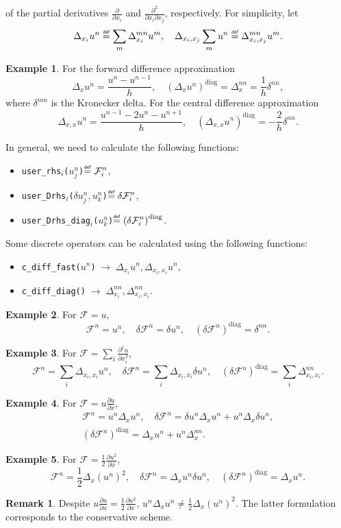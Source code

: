 \documentclass{article}
\newcommand{\pert}[1]{\delta#1}
\newcommand{\pder}[2][]{\frac{\partial#1}{\partial#2}}      %
\newcommand{\dder}[1]{\Delta_{#1}}                          %
\newcommand{\pderder}[3][]{\frac{\partial^2#1}{\partial#2\partial#3}}
\newcommand{\pderdual}[2][]{\frac{\partial^2#1}{\partial#2^2}}
\newcommand{\FF}{\mathcal{F}}
\newcommand{\diag}[1]{\left(#1\right)^\mathrm{diag}}
\newcommand{\eqdef}{\mathrel{\overset{\makebox[0pt]{\mbox{\normalfont\tiny\sffamily def}}}{=}}}
\newcommand{\funcUser}[4]{\texttt{user\_#1\(_{#3}\)(\(#2\))}\(\eqdef\displaystyle#4\)}
\newcommand{\funcDiff}[3]{\texttt{c\_diff\_#1(\(#2\))}\(\;\longrightarrow\;#3\)}
\theoremstyle{definition}
\newtheorem{example}{Example}
\newtheorem{remark}{Remark}
\begin{document}
of the partial derivatives \(\pder{x_i}\) and \(\pderder{x_i}{x_j}\), respectively.
For simplicity, let
\begin{equation}\label{eq:dder}
     \dder{x_i}u^n\eqdef\sum_m\dder{x_i}^{mn}u^m, \quad \dder{x_i,x_j}\sum_mu^n\eqdef\dder{x_i,x_j}^{mn}u^m.
\end{equation}
\begin{example}
    For the forward difference approximation
    \[ \dder{x}u^n = \frac{u^n-u^{n-1}}{h}, \quad \diag{\dder{x}u^n} = \dder{x}^{nn} = \frac1h\delta^{nn}, \]
    where \(\delta^{mn}\) is the Kronecker delta.
    For the central difference approximation
    \[ \dder{x,x}u^n = \frac{u^{n-1}-2u^n-u^{n+1}}{h}, \quad \diag{\dder{x,x}u^n} = -\frac2h\delta^{nn}. \]
\end{example}
In general, we need to calculate the following functions:
\begin{itemize}
    \item \funcUser{rhs}{u_j^n}{i}{ \FF_i^n },
    \item \funcUser{Drhs}{\pert{u_j^n},u_k^n}{i}{ \pert{\FF_i^n} },
    \item \funcUser{Drhs\_diag}{u_k^n}{i}{ \diag{\pert{\FF_i^n}} }.
\end{itemize}
Some discrete operators can be calculated using the following functions:
\begin{itemize}
    \item \funcDiff{fast}{u^n}{\dder{x_i}u^n, \dder{x_i,x_i}u^n},
    \item \funcDiff{diag}{}{\dder{x_i}^{nn}, \dder{x_i,x_i}^{nn}}.
\end{itemize}
\begin{example}
    For \(\FF = u\), \[
        \FF^n = u^n, \quad \pert{\FF^n} = \pert{u^n}, \quad \diag{\pert{\FF^n}} = \delta^{nn}.
    \]
\end{example}
\begin{example}
    For \(\FF = \sum_i\pderdual[u]{x_i}\), \[
        \FF^n = \sum_i\dder{x_i,x_i}u^n, \quad
        \pert{\FF^n} = \sum_i\dder{x_i,x_i}\pert{u^n}, \quad
        \diag{\pert{\FF^n}} = \sum_i\dder{x_i,x_i}^{nn}.
    \]
\end{example}
\begin{example}
    For \(\FF = u\pder[u]{x}\), \[
        \begin{gathered}
        \FF^n = u^n\dder{x}u^n, \quad
        \pert{\FF^n} = \pert{u^n}\dder{x}u^n + u^n\dder{x}\pert{u^n}, \\
        \diag{\pert{\FF^n}} = \dder{x}u^n + u^n\dder{x}^{nn}.
        \end{gathered}
    \]
\end{example}
\begin{example}
    For \(\FF = \frac12\pder[u^2]{x}\), \[
        \FF^n = \frac12\dder{x}(u^n)^2, \quad
        \pert{\FF^n} = \dder{x}u^n\pert{u^n}, \quad
        \diag{\pert{\FF^n}} = \dder{x}u^n.
    \]
\end{example}
\begin{remark}
    Despite \(u\pder[u]{x} = \frac12\pder[u^2]{x}\), \(u^n\dder{x}u^n \neq \frac12\dder{x}(u^n)^2\).
    The latter formulation corresponds to the conservative scheme.
\end{remark}
\end{document}
